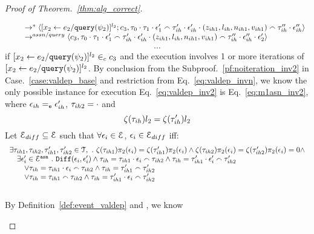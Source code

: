 \begin{proof}[Proof of Theorem.~\ref{thm:alg_correct}]
\begin{case}
\begin{subcase}
\[\begin{array}{l}
  \qquad \rightarrow^{*} 
  \langle [\mathrel{ {x}_2 \leftarrow e_2 / {\tt query}(\psi_2) }]^{l_2};{c}_3, 
  \mathtt{\tau}_0 \cdot \mathtt{\tau}_1 \cdot \mathtt{\epsilon}_1'  \smallfrown \mathtt{\tau}_{ih}' \cdot \mathtt{\epsilon}_{ih}' \cdot (z_{ih1}, l_{ih}, n_{ih1}, v_{ih1}) \smallfrown \mathtt{\tau}_{ih}'' \cdot \mathtt{\epsilon}_{ih}'' \rangle 
  \\ \qquad
  \rightarrow^{assn/query} 
  \langle {c}_3,  \mathtt{\tau}_0 \cdot \mathtt{\tau}_1 \cdot \mathtt{\epsilon}_1' \smallfrown \mathtt{\tau}_{ih}' \cdot \mathtt{\epsilon}_{ih}' \cdot (z_{ih1}, l_{ih}, n_{ih1}, v_{ih1}) \smallfrown \mathtt{\tau}_{ih}'' \cdot \mathtt{\epsilon}_{ih}''\cdot \mathtt{\epsilon}_2' \rangle 
\end{array}
\]
%
 \[\cdots\]
 if $[\mathrel{ {x}_2 \leftarrow e_2 / {\tt query}(\psi_2) }]^{l_2} \in_c c_3$ and the execution involves 1 or more iterations of $[\mathrel{ {x}_2 \leftarrow e_2 / {\tt query}(\psi_2) }]^{l_2}$.
 By conclusion from the Subproof.~\ref{pf:noiteration_inv2} in Case.~\ref{case:valdep_base} and restriction from Eq.~\ref{eq:valdep_invn}, 
 we know the only possible instance for execution Eq.~\ref{eq:valdep_inv2} is Eq.~\ref{eq:m1asn_inv2},
 where $\mathtt{\epsilon}_{ih} =_{\mathtt{e}} \mathtt{\epsilon}_{ih}'$, $\mathtt{\tau}_{ih2} = \cdot$ and
 \[
 \mathtt{\zeta}(\mathtt{\tau}_{ih}) l_2 = \mathtt{\zeta}(\mathtt{\tau}_{ih}') l_2
 \]
%
%
Let $\mathcal{E}_{diff} \subseteq \mathcal{E} $ such that $\forall \mathtt{\epsilon}_i \in \mathcal{E}$, $\mathtt{\epsilon}_i \in \mathcal{E}_{diff}$ iff:
\begin{equation}
\label{eq:valdep_ihdiff}
  \begin{array}{l}
  \exists \mathtt{\tau}_{ih1}, \mathtt{\tau}_{ih2}, \mathtt{\tau}_{ih1}', \mathtt{\tau}_{ih2}' \in \mathcal{T},
  ~.~ 
  \mathtt{\zeta} (\mathtt{\tau}_{ih1} )\pi_2({\mathtt{\epsilon}_i}) = \mathtt{\zeta}(\mathtt{\tau}_{ih1}') \pi_2(\mathtt{\epsilon}_i) \land
  \mathtt{\zeta} (\mathtt{\tau}_{ih2} )\pi_2({\mathtt{\epsilon}_i}) = \mathtt{\zeta}(\mathtt{\tau}_{ih2}') \pi_2(\mathtt{\epsilon}_i) = 0
  \land
  \\ \quad \exists \mathtt{\epsilon}_i' \in \mathcal{E}^{\mathtt{{asn}}}  ~.~
  \mathtt{Diff}(\mathtt{\epsilon}_i, \mathtt{\epsilon}_i') \land 
  \mathtt{\tau}_{ih} = \mathtt{\tau}_{ih1} \cdot \mathtt{\epsilon}_i \smallfrown \mathtt{\tau}_{ih2} 
  \land 
  \mathtt{\tau}_{ih} = \mathtt{\tau}_{ih1}' \cdot \mathtt{\epsilon}_i' \smallfrown \mathtt{\tau}_{ih2}'
  \\ \qquad \lor 
  \mathtt{\tau}_{ih} = \mathtt{\tau}_{ih1} \cdot \mathtt{\epsilon}_i \smallfrown \mathtt{\tau}_{ih2} 
  \land 
  \mathtt{\tau}_{ih} = \mathtt{\tau}_{ih1}' \smallfrown \mathtt{\tau}_{ih2}'
  \\ \qquad \lor 
  \mathtt{\tau}_{ih} = \mathtt{\tau}_{ih1} \smallfrown \mathtt{\tau}_{ih2} 
  \land 
  \mathtt{\tau}_{ih} = \mathtt{\tau}_{ih1}' \cdot \mathtt{\epsilon}_i \smallfrown \mathtt{\tau}_{ih2}'
  \end{array}
\end{equation}
%
\\
By Definition~\ref{def:event_valdep} and , we know

\end{subcase}
\end{case}
\end{proof}

